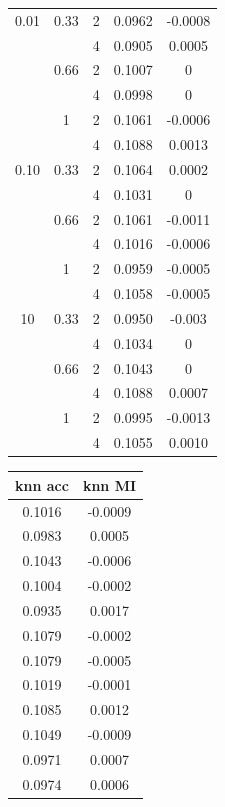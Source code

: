 \documentclass[./dissertation.tex]{subfiles}
\begin{document}
\begin{table}[]
\begin{tabular}{|c|c|c|c|c|}
            \hline
             0.01 & 0.33 & 2 & 0.0962 & -0.0008 \\
             &  & 4 & 0.0905 & 0.0005 \\
             & 0.66 & 2 & 0.1007 & 0  \\
             &  & 4 & 0.0998 & 0  \\
             & 1 & 2 & 0.1061 & -0.0006  \\
             &  & 4 & 0.1088 & 0.0013  \\
             0.10 & 0.33 & 2 & 0.1064 & 0.0002 \\
             &  & 4 & 0.1031 & 0 \\
             & 0.66 & 2 & 0.1061 & -0.0011 \\
             &  & 4 & 0.1016 & -0.0006  \\
             & 1 & 2 & 0.0959 & -0.0005  \\
             &  & 4 & 0.1058 & -0.0005 \\
             10 & 0.33 & 2 & 0.0950 & -0.003 \\
             &  & 4 & 0.1034 & 0 \\
             & 0.66 & 2 & 0.1043 & 0 \\
             &  & 4 & 0.1088 & 0.0007 \\
             & 1 & 2 & 0.0995 & -0.0013 \\
             &  & 4 & 0.1055 & 0.0010 \\
            \hline
       \end{tabular}
       \begin{tabular}{|c|c|}
            \hline
            \textbf{knn acc} & \textbf{knn MI}  \\
            \hline
            0.1016 & -0.0009 \\
            0.0983 & 0.0005 \\
            0.1043 & -0.0006 \\
            0.1004 & -0.0002 \\
            0.0935 & 0.0017 \\
            0.1079 & -0.0002 \\
            0.1079 & -0.0005 \\
            0.1019 & -0.0001 \\
            0.1085 & 0.0012 \\
            0.1049 & -0.0009 \\
            0.0971 & 0.0007 \\
            0.0974 & 0.0006 \\

\end{tabular}
\end{table}
\end{document}
